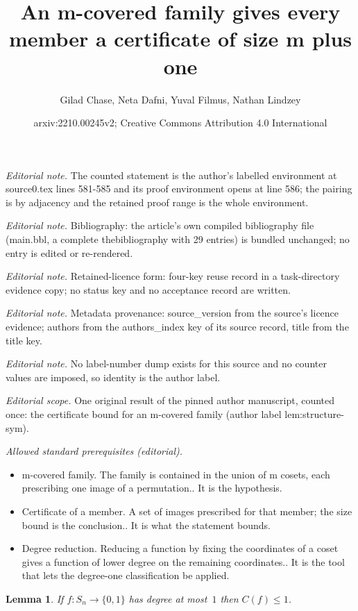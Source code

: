 \documentclass[10pt,a4paper]{article}
\title{An m-covered family gives every member a certificate of size m plus one}
\author{Gilad Chase, Neta Dafni, Yuval Filmus, Nathan Lindzey}
\date{arxiv:2210.00245v2; Creative Commons Attribution 4.0 International}
\newtheorem{lemma}[theorem]{Lemma}
\theoremstyle{definition}
\begin{document}
\maketitle
\noindent\textit{Editorial note.} The counted statement is the author's labelled environment at source0.tex lines 581-585 and its proof environment opens at line 586; the pairing is by adjacency and the retained proof range is the whole environment.\par\medskip
\noindent\textit{Editorial note.} Bibliography: the article's own compiled bibliography file (main.bbl, a complete thebibliography with 29 entries) is bundled unchanged; no entry is edited or re-rendered.\par\medskip
\noindent\textit{Editorial note.} Retained-licence form: four-key reuse record in a task-directory evidence copy; no status key and no acceptance record are written.\par\medskip
\noindent\textit{Editorial note.} Metadata provenance: source\_version from the source's licence evidence; authors from the authors\_index key of its source record, title from the title key.\par\medskip
\noindent\textit{Editorial note.} No label-number dump exists for this source and no counter values are imposed, so identity is the author label.\par\medskip
\noindent\textit{Editorial scope.} One original result of the pinned author manuscript, counted once: the certificate bound for an m-covered family (author label lem:structure-sym).\par\medskip
\noindent\textit{Allowed standard prerequisites (editorial).}\begin{itemize}
\item m-covered family. The family is contained in the union of m cosets, each prescribing one image of a permutation.. It is the hypothesis.
\item Certificate of a member. A set of images prescribed for that member; the size bound is the conclusion.. It is what the statement bounds.
\item Degree reduction. Reducing a function by fixing the coordinates of a coset gives a function of lower degree on the remaining coordinates.. It is the tool that lets the degree-one classification be applied.
\end{itemize}\medskip
\begin{lemma} \label{lem:degree1-cert-sym}
If $f\colon S_n \to \{0,1\}$ has degree at most~$1$ then $C(f) \leq 1$.
\end{lemma}
\end{document}
